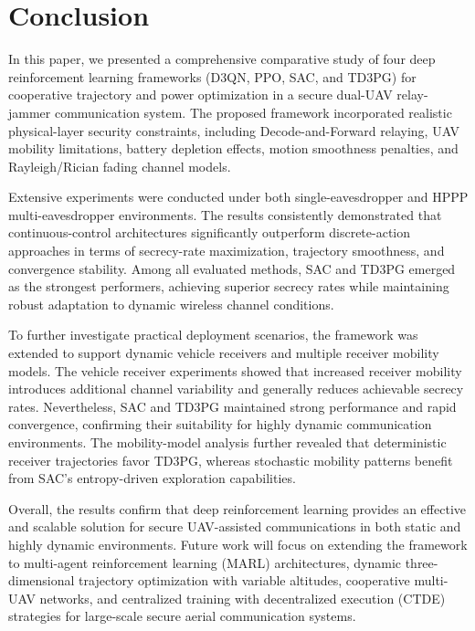 \documentclass[journal,onecolumn]{IEEEtran}
\begin{document}
\section{Conclusion}
In this paper, we presented a comprehensive comparative study of four deep reinforcement learning frameworks (D3QN, PPO, SAC, and TD3PG) for cooperative trajectory and power optimization in a secure dual-UAV relay-jammer communication system. The proposed framework incorporated realistic physical-layer security constraints, including Decode-and-Forward relaying, UAV mobility limitations, battery depletion effects, motion smoothness penalties, and Rayleigh/Rician fading channel models.

Extensive experiments were conducted under both single-eavesdropper and HPPP multi-eavesdropper environments. The results consistently demonstrated that continuous-control architectures significantly outperform discrete-action approaches in terms of secrecy-rate maximization, trajectory smoothness, and convergence stability. Among all evaluated methods, SAC and TD3PG emerged as the strongest performers, achieving superior secrecy rates while maintaining robust adaptation to dynamic wireless channel conditions.

To further investigate practical deployment scenarios, the framework was extended to support dynamic vehicle receivers and multiple receiver mobility models. The vehicle receiver experiments showed that increased receiver mobility introduces additional channel variability and generally reduces achievable secrecy rates. Nevertheless, SAC and TD3PG maintained strong performance and rapid convergence, confirming their suitability for highly dynamic communication environments. The mobility-model analysis further revealed that deterministic receiver trajectories favor TD3PG, whereas stochastic mobility patterns benefit from SAC's entropy-driven exploration capabilities.

Overall, the results confirm that deep reinforcement learning provides an effective and scalable solution for secure UAV-assisted communications in both static and highly dynamic environments. Future work will focus on extending the framework to multi-agent reinforcement learning (MARL) architectures, dynamic three-dimensional trajectory optimization with variable altitudes, cooperative multi-UAV networks, and centralized training with decentralized execution (CTDE) strategies for large-scale secure aerial communication systems.

\end{document}
